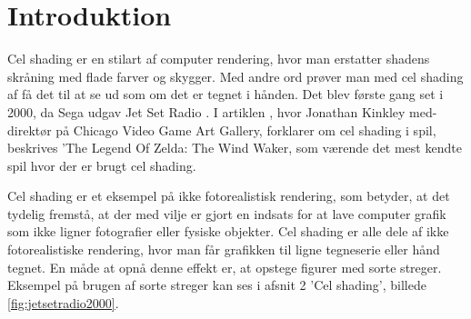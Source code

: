 \newpage
\section{Introduktion}
\setcounter{page}{1}
Cel shading er en stilart af computer rendering, hvor man erstatter shadens skråning med flade farver og skygger. Med andre ord prøver man med cel shading af få det til at se ud som om det er tegnet i hånden. Det blev første gang set i 2000, da Sega udgav Jet Set Radio \cite{tvtropes2016}.
I artiklen \cite{Kinkley2016}, hvor Jonathan Kinkley med-direktør på Chicago Video Game Art Gallery, forklarer om cel shading i spil, beskrives ’The Legend Of Zelda: The Wind Waker, som værende det mest kendte spil hvor der er brugt cel shading. 

Cel shading er et eksempel på ikke fotorealistisk rendering, som betyder, at  det tydelig fremstå, at der med vilje er gjort en indsats for at lave computer grafik som ikke ligner fotografier eller fysiske objekter. Cel shading er alle dele af ikke fotorealistiske rendering, hvor man får grafikken til ligne tegneserie eller hånd tegnet. 
En måde at opnå denne effekt er, at opstege figurer med sorte streger. Eksempel på brugen af sorte streger kan ses i afsnit 2 'Cel shading', billede \ref{fig:jetsetradio2000}.
